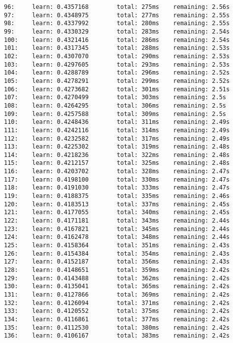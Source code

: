 \documentclass[11pt]{article}
\begin{document}
\begin{Verbatim}[commandchars=\\\{\}]
96:     learn: 0.4357168        total: 275ms    remaining: 2.56s
97:     learn: 0.4348975        total: 277ms    remaining: 2.55s
98:     learn: 0.4337992        total: 280ms    remaining: 2.55s
99:     learn: 0.4330329        total: 283ms    remaining: 2.54s
100:    learn: 0.4321416        total: 286ms    remaining: 2.54s
101:    learn: 0.4317345        total: 288ms    remaining: 2.53s
102:    learn: 0.4307070        total: 290ms    remaining: 2.53s
103:    learn: 0.4297605        total: 293ms    remaining: 2.53s
104:    learn: 0.4288789        total: 296ms    remaining: 2.52s
105:    learn: 0.4278291        total: 299ms    remaining: 2.52s
106:    learn: 0.4273682        total: 301ms    remaining: 2.51s
107:    learn: 0.4270499        total: 303ms    remaining: 2.5s
108:    learn: 0.4264295        total: 306ms    remaining: 2.5s
109:    learn: 0.4257588        total: 309ms    remaining: 2.5s
110:    learn: 0.4248436        total: 311ms    remaining: 2.49s
111:    learn: 0.4242116        total: 314ms    remaining: 2.49s
112:    learn: 0.4232582        total: 317ms    remaining: 2.49s
113:    learn: 0.4225302        total: 319ms    remaining: 2.48s
114:    learn: 0.4218236        total: 322ms    remaining: 2.48s
115:    learn: 0.4212157        total: 325ms    remaining: 2.48s
116:    learn: 0.4203702        total: 328ms    remaining: 2.47s
117:    learn: 0.4198100        total: 330ms    remaining: 2.47s
118:    learn: 0.4191030        total: 333ms    remaining: 2.47s
119:    learn: 0.4188375        total: 335ms    remaining: 2.46s
120:    learn: 0.4183513        total: 337ms    remaining: 2.45s
121:    learn: 0.4177055        total: 340ms    remaining: 2.45s
122:    learn: 0.4171181        total: 343ms    remaining: 2.44s
123:    learn: 0.4167821        total: 345ms    remaining: 2.44s
124:    learn: 0.4162478        total: 348ms    remaining: 2.44s
125:    learn: 0.4158364        total: 351ms    remaining: 2.43s
126:    learn: 0.4154384        total: 354ms    remaining: 2.43s
127:    learn: 0.4152187        total: 356ms    remaining: 2.43s
128:    learn: 0.4148651        total: 359ms    remaining: 2.42s
129:    learn: 0.4143488        total: 362ms    remaining: 2.42s
130:    learn: 0.4135041        total: 365ms    remaining: 2.42s
131:    learn: 0.4127866        total: 369ms    remaining: 2.42s
132:    learn: 0.4126094        total: 371ms    remaining: 2.42s
133:    learn: 0.4120552        total: 375ms    remaining: 2.42s
134:    learn: 0.4116861        total: 377ms    remaining: 2.42s
135:    learn: 0.4112530        total: 380ms    remaining: 2.42s
136:    learn: 0.4106167        total: 383ms    remaining: 2.42s

\end{Verbatim}
\end{document}

